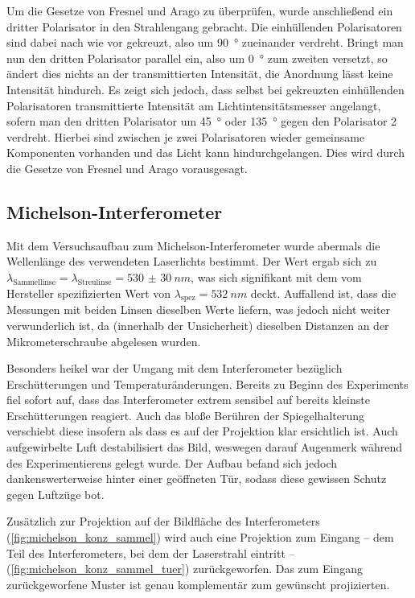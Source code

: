 \documentclass[ngerman]{scrartcl}
\begin{document}
Um die Gesetze von Fresnel und Arago zu überprüfen, wurde anschließend ein dritter Polarisator in den Strahlengang gebracht. Die einhüllenden Polarisatoren sind dabei nach wie vor gekreuzt, also um \SI{90}{\degree} zueinander verdreht. Bringt man nun den dritten Polarisator parallel ein, also um \SI{0}{\degree} zum zweiten versetzt, so ändert dies nichts an der transmittierten Intensität, die Anordnung lässt keine Intensität hindurch. Es zeigt sich jedoch, dass selbst bei gekreuzten einhüllenden Polarisatoren transmittierte Intensität am Lichtintensitätsmesser angelangt, sofern man den dritten Polarisator um \SI{45}{\degree} oder \SI{135}{\degree} gegen den Polarisator 2 verdreht. Hierbei sind zwischen je zwei Polarisatoren wieder gemeinsame Komponenten vorhanden und das Licht kann hindurchgelangen. Dies wird durch die Gesetze von Fresnel und Arago vorausgesagt.


\subsection{Michelson-Interferometer}
\label{subsec:diskussion_michelson}

Mit dem Versuchsaufbau zum Michelson-Interferometer wurde abermals die Wellenlänge des verwendeten Laserlichts bestimmt. Der Wert ergab sich zu \(\lambda_{\text{Sammellinse}} = \lambda_{\text{Streulinse}} = \SI{530(30)}{nm}\), was sich signifikant mit dem vom Hersteller spezifizierten Wert von $\lambda_{\text{spez}}=\SI{532}{nm}$ deckt. Auffallend ist, dass die Messungen mit beiden Linsen dieselben Werte liefern, was jedoch nicht weiter verwunderlich ist, da (innerhalb der Unsicherheit) dieselben Distanzen an der Mikrometerschraube abgelesen wurden.

Besonders heikel war der Umgang mit dem Interferometer bezüglich Erschütterungen und Temperaturänderungen. Bereits zu Beginn des Experiments fiel sofort auf, dass das Interferometer extrem sensibel auf bereits kleinste Erschütterungen reagiert. Auch das bloße Berühren der Spiegelhalterung verschiebt diese insofern als dass es auf der Projektion klar ersichtlich ist. Auch aufgewirbelte Luft destabilisiert das Bild, weswegen darauf Augenmerk während des Experimentierens gelegt wurde. Der Aufbau befand sich jedoch dankenswerterweise hinter einer geöffneten Tür, sodass diese gewissen Schutz gegen Luftzüge bot.

Zusätzlich zur Projektion auf der Bildfläche des Interferometers (\autoref{fig:michelson_konz_sammel}) wird auch eine Projektion zum Eingang -- dem Teil des Interferometers, bei dem der Laserstrahl eintritt -- (\autoref{fig:michelson_konz_sammel_tuer}) zurückgeworfen.
Das zum Eingang zurückgeworfene Muster ist genau komplementär zum gewünscht projizierten.
\end{document}
